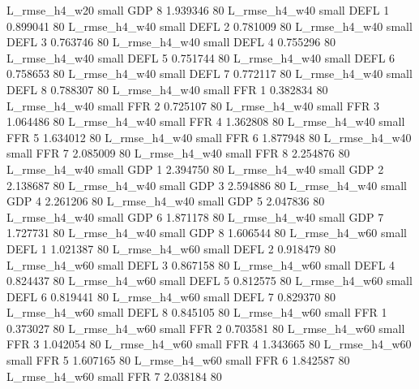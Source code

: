  L_rmse_h4_w20      small      GDP                 8 1.939346 80
 L_rmse_h4_w40      small     DEFL                 1 0.899041 80
 L_rmse_h4_w40      small     DEFL                 2 0.781009 80
 L_rmse_h4_w40      small     DEFL                 3 0.763746 80
 L_rmse_h4_w40      small     DEFL                 4 0.755296 80
 L_rmse_h4_w40      small     DEFL                 5 0.751744 80
 L_rmse_h4_w40      small     DEFL                 6 0.758653 80
 L_rmse_h4_w40      small     DEFL                 7 0.772117 80
 L_rmse_h4_w40      small     DEFL                 8 0.788307 80
 L_rmse_h4_w40      small      FFR                 1 0.382834 80
 L_rmse_h4_w40      small      FFR                 2 0.725107 80
 L_rmse_h4_w40      small      FFR                 3 1.064486 80
 L_rmse_h4_w40      small      FFR                 4 1.362808 80
 L_rmse_h4_w40      small      FFR                 5 1.634012 80
 L_rmse_h4_w40      small      FFR                 6 1.877948 80
 L_rmse_h4_w40      small      FFR                 7 2.085009 80
 L_rmse_h4_w40      small      FFR                 8 2.254876 80
 L_rmse_h4_w40      small      GDP                 1 2.394750 80
 L_rmse_h4_w40      small      GDP                 2 2.138687 80
 L_rmse_h4_w40      small      GDP                 3 2.594886 80
 L_rmse_h4_w40      small      GDP                 4 2.261206 80
 L_rmse_h4_w40      small      GDP                 5 2.047836 80
 L_rmse_h4_w40      small      GDP                 6 1.871178 80
 L_rmse_h4_w40      small      GDP                 7 1.727731 80
 L_rmse_h4_w40      small      GDP                 8 1.606544 80
 L_rmse_h4_w60      small     DEFL                 1 1.021387 80
 L_rmse_h4_w60      small     DEFL                 2 0.918479 80
 L_rmse_h4_w60      small     DEFL                 3 0.867158 80
 L_rmse_h4_w60      small     DEFL                 4 0.824437 80
 L_rmse_h4_w60      small     DEFL                 5 0.812575 80
 L_rmse_h4_w60      small     DEFL                 6 0.819441 80
 L_rmse_h4_w60      small     DEFL                 7 0.829370 80
 L_rmse_h4_w60      small     DEFL                 8 0.845105 80
 L_rmse_h4_w60      small      FFR                 1 0.373027 80
 L_rmse_h4_w60      small      FFR                 2 0.703581 80
 L_rmse_h4_w60      small      FFR                 3 1.042054 80
 L_rmse_h4_w60      small      FFR                 4 1.343665 80
 L_rmse_h4_w60      small      FFR                 5 1.607165 80
 L_rmse_h4_w60      small      FFR                 6 1.842587 80
 L_rmse_h4_w60      small      FFR                 7 2.038184 80
